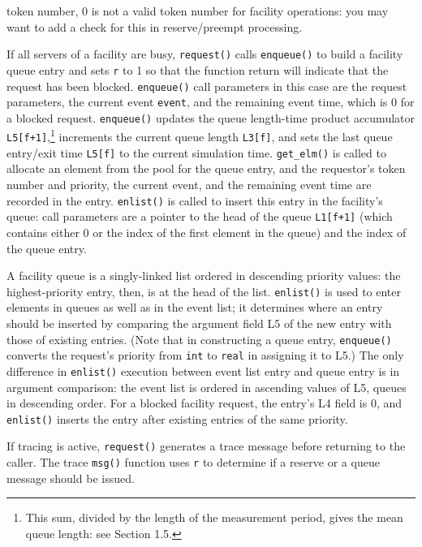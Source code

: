 \noindent token number, 0 is not a valid token number for facility operations: you may
want to add a check for this in reserve/preempt processing.

If all servers of a facility are busy, \texttt{request()} calls \texttt{enqueue()} to build
a facility queue entry and sets \texttt{r} to 1 so that the function return will indicate
that the request has been blocked. \texttt{enqueue()} call parameters in this case
are the request parameters, the current event \texttt{event}, and the remaining
event time, which is 0 for a blocked request. \texttt{enqueue()} updates the queue
length-time product accumulator \texttt{L5[f+1]},\footnote{This sum, divided by the length of the measurement period, gives the mean queue length: see Section 1.5.}
increments the current queue
length \texttt{L3[f]}, and sets the last queue entry/exit time \texttt{L5[f]} to the current
simulation time. \texttt{get\_elm()} is called to allocate an element from the pool
for the queue entry, and the requestor's token number and priority, the current
event, and the remaining event time are recorded in the entry. \texttt{enlist()} is
called to insert this entry in the facility's queue: call parameters are a
pointer to the head of the queue \texttt{L1[f+1]} (which contains either 0 or the
index of the first element in the queue) and the index of the queue entry.

A facility queue is a singly-linked list ordered in descending priority
values: the highest-priority entry, then, is at the head of the list.
\texttt{enlist()} is used to enter elements in queues as well as in the event list; it
determines where an entry should be inserted by comparing the argument
field L5 of the new entry with those of existing entries. (Note that in
constructing a queue entry, \texttt{enqueue()} converts the request's priority from
\texttt{int} to \texttt{real} in assigning it to L5.) The only difference in \texttt{enlist()}
execution between event list entry and queue entry is in argument comparison:
the event list is ordered in ascending values of L5, queues in descending order.
For a blocked facility request, the entry's L4 field is 0, and \texttt{enlist()} inserts
the entry after existing entries of the same priority.

If tracing is active, \texttt{request()} generates a trace message before
returning to the caller. The trace \texttt{msg()} function uses \texttt{r} to determine if a
reserve or a queue message should be issued.

